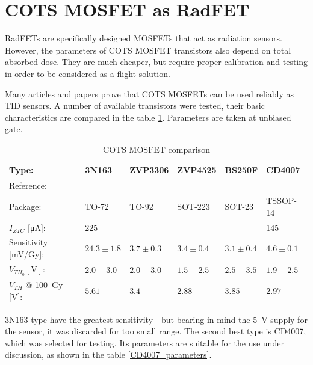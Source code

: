\section{COTS MOSFET as RadFET}
    RadFETs are specifically designed MOSFETs that act as radiation sensors. However, the parameters of COTS MOSFET transistors also depend on total absorbed dose. They are much cheaper, but require proper calibration and testing in order to be considered as a flight solution.

    Many articles and papers prove that COTS MOSFETs can be used reliably as TID sensors. A number of available transistors were tested, their basic characteristics are compared in the table \ref{cots_mosfet_comparison}. Parameters are taken at unbiased gate.

    \begin{table}[H]
    \caption{COTS MOSFET comparison}
    \label{cots_mosfet_comparison}
    \begin{tabular}{| L{2cm} | C{2.4cm} | C{2.4cm} | C{2.4cm} | C{2.4cm} | C{2.4cm} |}
        \hline
        Type: & 3N163 & ZVP3306 & ZVP4525 & BS250F & CD4007 \\ \hline
        Reference: & \cite{3N163_article} & \cite{COTSMosfetsGarcia} & \cite{COTSMosfetsGarcia} & \cite{COTSMosfetsGarcia} & \cite{COTSMosfetsGarcia} \\ \hline

        Package: & TO-72 & TO-92 & SOT-223 & SOT-23 & TSSOP-14 \\ \hline

        $I_{ZTC}$ [\si{\micro\ampere}]: & 225 & - & - & - & 145 \\ \hline

        Sensitivity [\si{\milli\volt/\gray}]: & $24.3\pm 1.8$ & $3.7\pm 0.3$ & $3.4\pm 0.4$ & $3.1\pm 0.4$ & $4.6\pm 0.1$ \\ \hline

        $V_{TH_0} [\si{\volt}]$: & $2.0 - 3.0$ & $2.0 - 3.0$ & $1.5 - 2.5$ & $2.5 - 3.5$ & $1.9 - 2.5$ \\ \hline

        $V_{TH}$ @ \SI{100}{\gray} [\si{\volt}]: & $5.61$ & $3.4$ & $2.88$ & $3.85$ & $2.97$ \\ \hline
    \end{tabular}
    \end{table}

    3N163 type have the greatest sensitivity - but bearing in mind the \SI{5}{\volt} supply for the sensor, it was discarded for too small range. The second best type is CD4007, which was selected for testing. Its parameters are suitable for the use under discussion, as shown in the table \ref{CD4007_parameters}.

